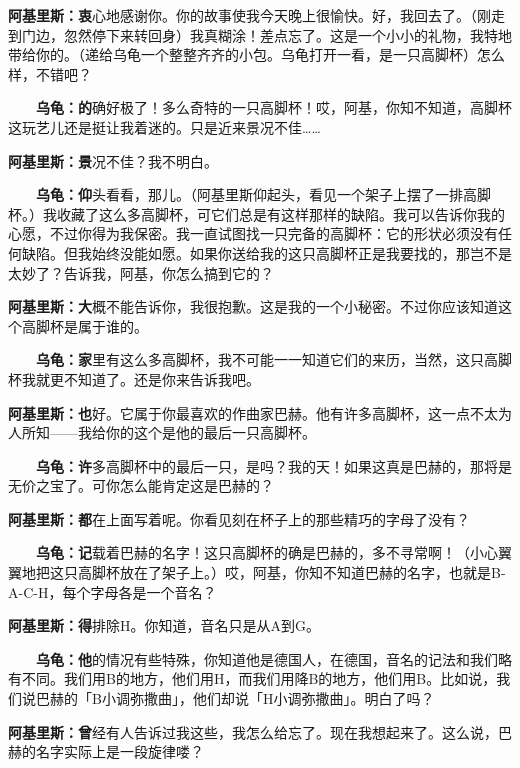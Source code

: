 \documentclass[
  12pt,
  twoside,
  openright,
  oldfontcommands,
]{memoir}
\newcommand{\kaitismall}[1]{{\kaitifamily\small #1}}
\newcommand{\heititext}[1]{{\heifamily\bfseries #1}}
\newcommand{\dialogname}[1]{{\heifamily\bfseries #1}}
\begin{document}
\dialogname{阿基里斯：}\heititext{衷}心地感谢你。你的故事使我今天晚上很愉快。好，我回去了。\kaitismall{（刚走到门边，忽然停下来转回身）}我真糊涂！差点忘了。这是一个小小的礼物，我特地带给你的。\kaitismall{（递给乌龟一个整整齐齐的小包。乌龟打开一看，是一只高脚杯）}怎么样，不错吧？

\dialogname{　　乌龟：}\heititext{的}确好极了！多么奇特的一只高脚杯！哎，阿基，你知不知道，高脚杯这玩艺儿还是挺让我着迷的。只是近来景况不佳\ldots\ldots{}

\dialogname{阿基里斯：}\heititext{景}况不佳？我不明白。

\dialogname{　　乌龟：}\heititext{仰}头看看，那儿。\kaitismall{（阿基里斯仰起头，看见一个架子上摆了一排高脚杯。）}我收藏了这么多高脚杯，可它们总是有这样那样的缺陷。我可以告诉你我的心愿，不过你得为我保密。我一直试图找一只完备的高脚杯：它的形状必须没有任何缺陷。但我始终没能如愿。如果你送给我的这只高脚杯正是我要找的，那岂不是太妙了？告诉我，阿基，你怎么搞到它的？

\dialogname{阿基里斯：}\heititext{大}概不能告诉你，我很抱歉。这是我的一个小秘密。不过你应该知道这个高脚杯是属于谁的。

\dialogname{　　乌龟：}\heititext{家}里有这么多高脚杯，我不可能一一知道它们的来历，当然，这只高脚杯我就更不知道了。还是你来告诉我吧。

\dialogname{阿基里斯：}\heititext{也}好。它属于你最喜欢的作曲家巴赫。他有许多高脚杯，这一点不太为人所知------我给你的这个是他的最后一只高脚杯。

\dialogname{　　乌龟：}\heititext{许}多高脚杯中的最后一只，是吗？我的天！如果这真是巴赫的，那将是无价之宝了。可你怎么能肯定这是巴赫的？

\dialogname{阿基里斯：}\heititext{都}在上面写着呢。你看见刻在杯子上的那些精巧的字母了没有？

\dialogname{　　乌龟：}\heititext{记}载着巴赫的名字！这只高脚杯的确是巴赫的，多不寻常啊！\kaitismall{（小心翼翼地把这只高脚杯放在了架子上。）}哎，阿基，你知不知道巴赫的名字，也就是B-A-C-H，每个字母各是一个音名？

\dialogname{阿基里斯：}\heititext{得}排除H。你知道，音名只是从A到G。

\dialogname{　　乌龟：}\heititext{他}的情况有些特殊，你知道他是德国人，在德国，音名的记法和我们略有不同。我们用B的地方，他们用H，而我们用降B的地方，他们用B。比如说，我们说巴赫的「B小调弥撒曲」，他们却说「H小调弥撒曲」。明白了吗？

\dialogname{阿基里斯：}\heititext{曾}经有人告诉过我这些，我怎么给忘了。现在我想起来了。这么说，巴赫的名字实际上是一段旋律喽？
\end{document}
